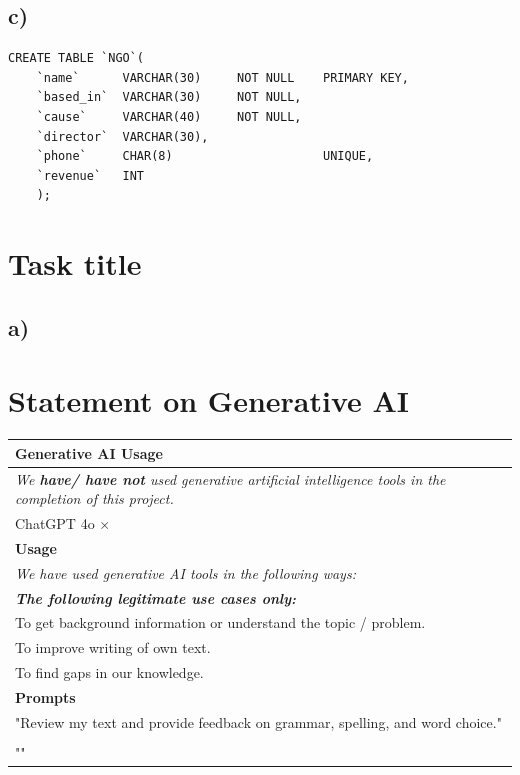 \documentclass[twoside, a4paper, 11pt]{article}
\begin{document}
\subsection*{c)}

\begin{lstlisting}[label=Third]
	CREATE TABLE `NGO`(
	`name` 		VARCHAR(30) 	NOT NULL	PRIMARY KEY,
	`based_in` 	VARCHAR(30)		NOT NULL,
	`cause` 	VARCHAR(40)		NOT NULL,
	`director` 	VARCHAR(30),
	`phone` 	CHAR(8)						UNIQUE,
	`revenue`	INT
	);
\end{lstlisting}



\section{Task title}
\subsection*{a)}





\newpage
	
\section*{Statement on Generative AI}


\begin{table}[ht]
		\centering
	\begin{tabular}{l}
			\toprule
			\rowcolor[rgb]{0.9,0.9,0.9} \textbf{Generative AI Usage} \\
			\midrule
			\textit{We \textbf{have/ have not} used generative artificial intelligence tools in the completion of this project.}\\
			ChatGPT 4o $\times$ \\ %
			\midrule
			\rowcolor[rgb]{0.9,0.9,0.9} \textbf{Usage} \\
			\midrule
			\textit{We have used generative AI tools in the following ways:}\\
			\textit{\small \textbf{The following legitimate use cases only:}}\\
			To get background information or understand the topic / problem.\\
			To improve writing of own text.\\
			To find gaps in our knowledge.\\
			\midrule
			\rowcolor[rgb]{0.9,0.9,0.9} \textbf{Prompts} \\
			\midrule
			"Review my text and provide feedback on grammar, spelling, and word choice."\\
			\\
			\noindent
			"" \\ %
			\bottomrule
	\end{tabular}
\end{table}
	
% 
% 
	
\end{document}
